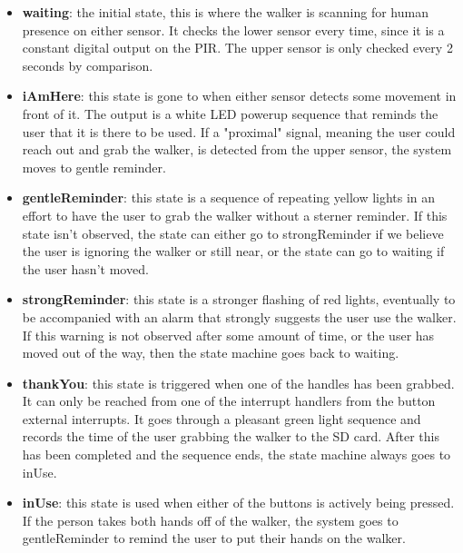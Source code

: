 \documentclass{article}
\begin{document}
\begin{itemize}
	\item \textbf{waiting}: the initial state, this is where the walker is scanning for human presence on either sensor. It checks the lower sensor every time, since it is a constant digital output on the PIR. The upper sensor is only checked every 2 seconds by comparison. 
	\item \textbf{iAmHere}: this state is gone to when either sensor detects some movement in front of it. The output is a white LED powerup sequence that reminds the user that it is there to be used. If a "proximal" signal, meaning the user could reach out and grab the walker, is detected from the upper sensor, the system moves to gentle reminder. 
	\item \textbf{gentleReminder}: this state is a sequence of repeating yellow lights in an effort to have the user to grab the walker without a sterner reminder. If this state isn't observed, the state can either go to strongReminder if we believe the user is ignoring the walker or still near, or the state can go to waiting if the user hasn't moved. 
	\item \textbf{strongReminder}: this state is a stronger flashing of red lights, eventually to be accompanied with an alarm that strongly suggests the user use the walker. If this warning is not observed after some amount of time, or the user has moved out of the way, then the state machine goes back to waiting. 
	\item \textbf{thankYou}: this state is triggered when one of the handles has been grabbed. It can only be reached from one of the interrupt handlers from the button external interrupts. It goes through a pleasant green light sequence and records the time of the user grabbing the walker to the SD card. After this has been completed and the sequence ends, the state machine always goes to inUse. 
	\item \textbf{inUse}: this state is used when either of the buttons is actively being pressed. If the person takes both hands off of the walker, the system goes to gentleReminder to remind the user to put their hands on the walker. 
\end{itemize}

\end{document}
